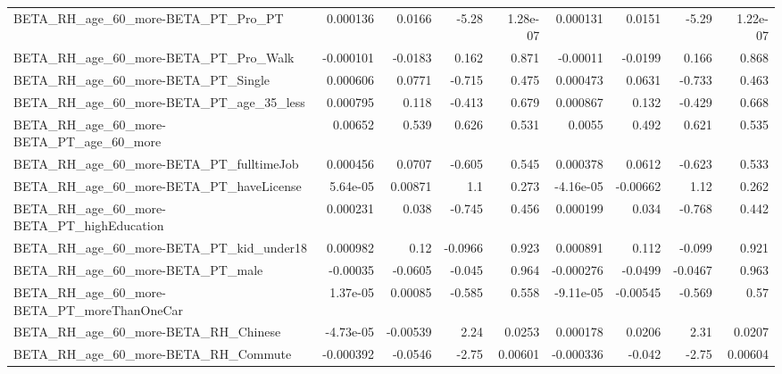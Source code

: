 \begin{tabular}{lrrrrrrrr}
BETA\_RH\_age\_60\_more-BETA\_PT\_Pro\_PT                 &    0.000136 &       0.0166 &     -5.28 & 1.28e-07 &   0.000131 &      0.0151 &        -5.29 &      1.22e-07 \\
BETA\_RH\_age\_60\_more-BETA\_PT\_Pro\_Walk               &   -0.000101 &      -0.0183 &     0.162 &    0.871 &   -0.00011 &     -0.0199 &        0.166 &         0.868 \\
BETA\_RH\_age\_60\_more-BETA\_PT\_Single                 &    0.000606 &       0.0771 &    -0.715 &    0.475 &   0.000473 &      0.0631 &       -0.733 &         0.463 \\
BETA\_RH\_age\_60\_more-BETA\_PT\_age\_35\_less            &    0.000795 &        0.118 &    -0.413 &    0.679 &   0.000867 &       0.132 &       -0.429 &         0.668 \\
BETA\_RH\_age\_60\_more-BETA\_PT\_age\_60\_more            &     0.00652 &        0.539 &     0.626 &    0.531 &     0.0055 &       0.492 &        0.621 &         0.535 \\
BETA\_RH\_age\_60\_more-BETA\_PT\_fulltimeJob            &    0.000456 &       0.0707 &    -0.605 &    0.545 &   0.000378 &      0.0612 &       -0.623 &         0.533 \\
BETA\_RH\_age\_60\_more-BETA\_PT\_haveLicense            &    5.64e-05 &      0.00871 &       1.1 &    0.273 &  -4.16e-05 &    -0.00662 &         1.12 &         0.262 \\
BETA\_RH\_age\_60\_more-BETA\_PT\_highEducation          &    0.000231 &        0.038 &    -0.745 &    0.456 &   0.000199 &       0.034 &       -0.768 &         0.442 \\
BETA\_RH\_age\_60\_more-BETA\_PT\_kid\_under18            &    0.000982 &         0.12 &   -0.0966 &    0.923 &   0.000891 &       0.112 &       -0.099 &         0.921 \\
BETA\_RH\_age\_60\_more-BETA\_PT\_male                   &    -0.00035 &      -0.0605 &    -0.045 &    0.964 &  -0.000276 &     -0.0499 &      -0.0467 &         0.963 \\
BETA\_RH\_age\_60\_more-BETA\_PT\_moreThanOneCar         &    1.37e-05 &      0.00085 &    -0.585 &    0.558 &  -9.11e-05 &    -0.00545 &       -0.569 &          0.57 \\
BETA\_RH\_age\_60\_more-BETA\_RH\_Chinese                &   -4.73e-05 &     -0.00539 &      2.24 &   0.0253 &   0.000178 &      0.0206 &         2.31 &        0.0207 \\
BETA\_RH\_age\_60\_more-BETA\_RH\_Commute                &   -0.000392 &      -0.0546 &     -2.75 &  0.00601 &  -0.000336 &      -0.042 &        -2.75 &       0.00604 \\

\end{tabular}

